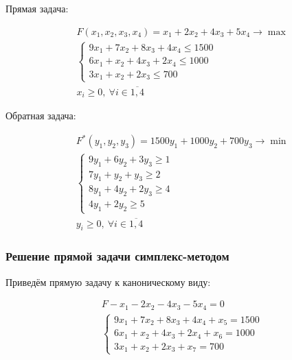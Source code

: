 Прямая задача:

\begin{align*}
     & F(x_{ 1}, x_{ 2}, x_{ 3} , x_{ 4}) = x_{ 1} + 2x_{ 2} + 4x_{ 3} + 5x_4 \to \max \\
     & \begin{cases}
           9x_1 + 7x_2 + 8x_3 + 4x_4 \leq 1500 \\
           6x_1 + x_2 + 4x_3 + 2x_4 \leq 1000  \\
           3x_1 + x_2 + 2x_3 \leq 700
       \end{cases}                                             \\
     & x_i \geq 0, \ \forall i\in\overline{1,4}
\end{align*}

Обратная задача:

\begin{align*}
     & F^{ *}(y_{ 1}, y_{ 2}, y_{ 3}) = 1500y_{ 1} + 1000y_{ 2} + 700y_{ 3} \to \min \\
     & \begin{cases}
           9y_1 + 6y_2 + 3y_3 \geq 1 \\
           7y_1 + y_2 + y_3 \geq 2   \\
           8y_1 + 4y_2 + 2y_3 \geq 4 \\
           4y_1 + 2y_2 \geq 5
       \end{cases}                                                     \\
     & y_i \geq 0, \ \forall i\in\overline{1,4}
\end{align*}

\subsubsection{Решение прямой задачи симплекс-методом}

Приведём прямую задачу к каноническому виду:

\begin{align*}
     & F - x_{ 1} - 2x_{ 2} - 4x_{ 3} - 5x_4 = 0 \\
     & \begin{cases}
           9x_1 + 7x_2 + 8x_3 + 4x_4 + x_5 = 1500 \\
           6x_1 + x_2 + 4x_3 + 2x_4 + x_6 = 1000  \\
           3x_1 + x_2 + 2x_3 + x_7 = 700
       \end{cases}    \\
\end{align*}

